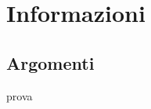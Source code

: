 \documentclass[12pt, a4paper]{report}
\begin{document}




\newpage
\tableofcontents
\newpage
{}
\section{Informazioni}

\subsection{Argomenti}
   prova
 
\end{document}
